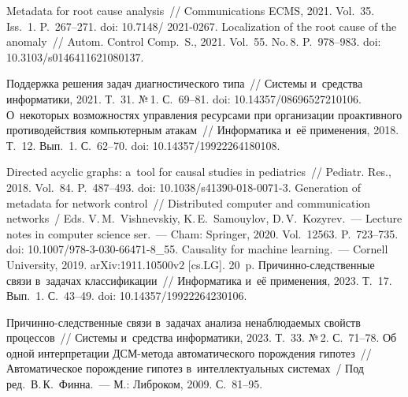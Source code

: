 \begin{multicols}{2}
{{\begin{thebibliography}{99}
 Metadata for root cause 
analysis~// Communications ECMS, 2021. Vol.~35. Iss.~1. P.~267--271. doi: 10.7148/ 2021-0267.
 Localization of the root cause 
of the anomaly~// Autom. Control Comp.~S., 2021. Vol.~55. No.\,8. P.~978--983. doi: 10.3103/s0146411621080137.

 Поддержка решения задач 
диагностического типа~// Сис\-те\-мы и~средства информатики, 2021. Т.~31. №\,1. С.~69--81. doi:
10.14357/08696527210106.
 О~некоторых 
возможностях управ\-ле\-ния ресурсами при организации проактивного противодействия 
компьютерным атакам~// Информатика и~её применения, 2018. Т.~12. Вып.~1. С.~62--70. doi: 
10.14357/19922264180108.


 Directed acyclic 
graphs: a~tool for causal studies in pediatrics~// Pediatr. Res., 2018. Vol.~84. P.~487--493.
doi: 10.1038/s41390-018-0071-3.
 Generation of metadata for network 
control~// Distributed computer and communication networks~/ Eds. V.\,M.~Vishnevskiy, 
K.\,E.~Samouylov, D.\,V.~Kozyrev.~--- Lecture notes in computer science ser.~--- Cham: Springer, 
2020. Vol.~12563. P.~723--735. doi: 10.1007/978-3-030-66471-8\_55.
 Causality for machine learning.~--- Cornell University,  
2019. arXiv:1911.10500v2 [cs.LG]. 20~p.
 При\-чин\-но-след\-ст\-вен\-ные связи в~задачах классификации~// Информатика 
и~её применения, 2023. Т.~17. Вып.~1. С.~43--49. doi: 10.14357/19922264230106.

 При\-чин\-но-след\-ст\-вен\-ные связи в~задачах анализа не\-наблюда\-емых 
свойств процессов~// Системы и~средства информатики, 2023. Т.~33. №\,2. С.~71--78.
 Об одной интерпретации ДСМ-метода автоматического порождения 
гипотез~// Автоматическое порождение гипотез в~интеллектуальных сис\-те\-мах~/
Под ред.\ В.\,К.~Финна.~--- М.: 
Либроком, 2009. С.~81--95.

\end{thebibliography}

 }
 }

\end{multicols}

